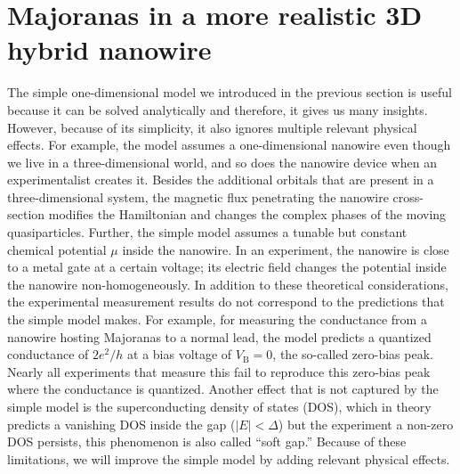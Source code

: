 \section{Majoranas in a more realistic 3D hybrid nanowire}\label{sec:realistic_nanowire}
The simple one-dimensional model we introduced in the previous section is useful because it can be solved analytically and therefore, it gives us many insights.
However, because of its simplicity, it also ignores multiple relevant physical effects.
For example, the model assumes a one-dimensional nanowire even though we live in a three-dimensional world, and so does the nanowire device when an experimentalist creates it.
Besides the additional orbitals that are present in a three-dimensional system, the magnetic flux penetrating the nanowire cross-section modifies the Hamiltonian and changes the complex phases of the moving quasiparticles.
Further, the simple model assumes a tunable but constant chemical potential $\mu$ inside the nanowire.
In an experiment, the nanowire is close to a metal gate at a certain voltage; its electric field changes the potential inside the nanowire non-homogeneously.
In addition to these theoretical considerations, the experimental measurement results do not correspond to the predictions that the simple model makes.
For example, for measuring the conductance from a nanowire hosting Majoranas to a normal lead, the model predicts a quantized conductance of $2 e^2/h$ at a bias voltage of $V_\textrm{B}=0$, the so-called zero-bias peak.
Nearly all experiments that measure this fail to reproduce this zero-bias peak where the conductance is quantized.  %
Another effect that is not captured by the simple model is the superconducting density of states (DOS), which in theory predicts a vanishing DOS inside the gap ($|E|<\Delta$) but the experiment a non-zero DOS persists, this phenomenon is also called ``soft gap.''
Because of these limitations, we will improve the simple model by adding relevant physical effects.

